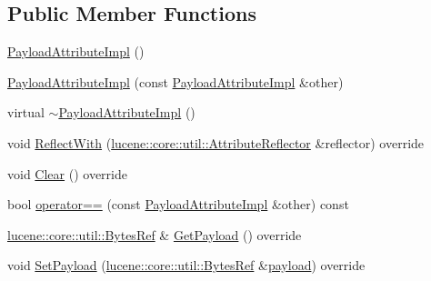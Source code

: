 \subsection*{Public Member Functions}
\begin{DoxyCompactItemize}
\item 
\mbox{\hyperlink{classlucene_1_1core_1_1analysis_1_1tokenattributes_1_1PayloadAttributeImpl_a3f2e143ad91331fdb3123171aeba2b5b}{Payload\+Attribute\+Impl}} ()
\item 
\mbox{\hyperlink{classlucene_1_1core_1_1analysis_1_1tokenattributes_1_1PayloadAttributeImpl_ab110d44b86e2a332642d5b9f3166ef48}{Payload\+Attribute\+Impl}} (const \mbox{\hyperlink{classlucene_1_1core_1_1analysis_1_1tokenattributes_1_1PayloadAttributeImpl}{Payload\+Attribute\+Impl}} \&other)
\item 
virtual \mbox{\hyperlink{classlucene_1_1core_1_1analysis_1_1tokenattributes_1_1PayloadAttributeImpl_a03a337d859f174328c1b92ee46daf42c}{$\sim$\+Payload\+Attribute\+Impl}} ()
\item 
void \mbox{\hyperlink{classlucene_1_1core_1_1analysis_1_1tokenattributes_1_1PayloadAttributeImpl_ab012363b8b4ce7e15c9c91ba6ec0c325}{Reflect\+With}} (\mbox{\hyperlink{namespacelucene_1_1core_1_1util_a7dbb701adaed055f73fb95eec83da10a}{lucene\+::core\+::util\+::\+Attribute\+Reflector}} \&reflector) override
\item 
void \mbox{\hyperlink{classlucene_1_1core_1_1analysis_1_1tokenattributes_1_1PayloadAttributeImpl_a264f13a218ec4caca8c724e3c34f64b6}{Clear}} () override
\item 
bool \mbox{\hyperlink{classlucene_1_1core_1_1analysis_1_1tokenattributes_1_1PayloadAttributeImpl_a2022641a26ad34c34b75cf47caf2f223}{operator==}} (const \mbox{\hyperlink{classlucene_1_1core_1_1analysis_1_1tokenattributes_1_1PayloadAttributeImpl}{Payload\+Attribute\+Impl}} \&other) const
\item 
\mbox{\hyperlink{classlucene_1_1core_1_1util_1_1BytesRef}{lucene\+::core\+::util\+::\+Bytes\+Ref}} \& \mbox{\hyperlink{classlucene_1_1core_1_1analysis_1_1tokenattributes_1_1PayloadAttributeImpl_a60adf0536ed3492e2cbfc2f59846ff8d}{Get\+Payload}} () override
\item 
void \mbox{\hyperlink{classlucene_1_1core_1_1analysis_1_1tokenattributes_1_1PayloadAttributeImpl_a69b9a7d6938f53e84dff76d6a0e9c2f3}{Set\+Payload}} (\mbox{\hyperlink{classlucene_1_1core_1_1util_1_1BytesRef}{lucene\+::core\+::util\+::\+Bytes\+Ref}} \&\mbox{\hyperlink{classlucene_1_1core_1_1analysis_1_1tokenattributes_1_1PayloadAttributeImpl_ac5bd28a25a555ffb21b75fda1036def1}{payload}}) override

\end{DoxyCompactItemize}

